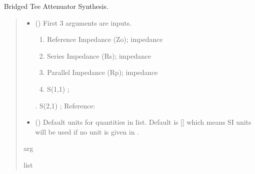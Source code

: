 \documentclass[letterpaper,10pt,english]{sphinxmanual}
\begin{document}

\begin{fulllineitems}
\label{\detokenize{components:components.Bridged_Tee_Attenuator_Synthesis}}
\pysigstartsignatures
{}
\pysigstopsignatures
\sphinxAtStartPar
Bridged Tee Attenuator Synthesis.
\begin{quote}\begin{description}
\begin{itemize}
\item {}
\sphinxAtStartPar
{} () \textendash{}
\sphinxAtStartPar
First 3 arguments are inputs.
\begin{enumerate}
%
\item {}
\sphinxAtStartPar
Reference Impedance (Zo); impedance

\item {}
\sphinxAtStartPar
Series Impedance (Rs); impedance

\item {}
\sphinxAtStartPar
Parallel Impedance (Rp); impedance

\item {}
\sphinxAtStartPar
S(1,1) ;

\end{enumerate}

. S(2,1) ;
Reference:


\item {}
\sphinxAtStartPar
{} (\sphinxstyleliteralemphasis{\sphinxupquote{, }}) \textendash{} Default units for quantities in  list. Default is {[}{]} which means SI units will be used if no unit is given in .

\end{itemize}

\sphinxAtStartPar
arg

\sphinxAtStartPar
list

\end{description}\end{quote}

\end{fulllineitems}
\end{document}

